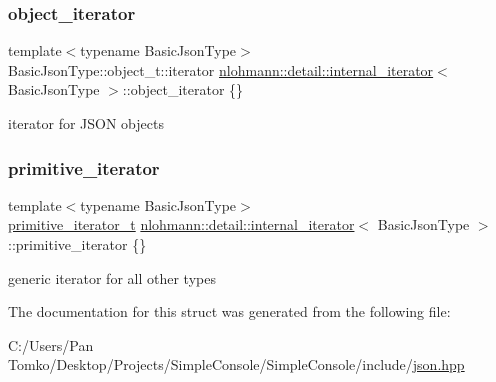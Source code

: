 \subsubsection{\texorpdfstring{object\_iterator}{object\_iterator}}
{\footnotesize\ttfamily template$<$typename Basic\+Json\+Type$>$ \\
Basic\+Json\+Type\+::object\+\_\+t\+::iterator \mbox{\hyperlink{structnlohmann_1_1detail_1_1internal__iterator}{nlohmann\+::detail\+::internal\+\_\+iterator}}$<$ Basic\+Json\+Type $>$\+::object\+\_\+iterator \{\}}



iterator for J\+S\+ON objects 

\mbox{\label{structnlohmann_1_1detail_1_1internal__iterator_a2b3bb45f968210e42c282017eeeb63a8}} 
\subsubsection{\texorpdfstring{primitive\_iterator}{primitive\_iterator}}
{\footnotesize\ttfamily template$<$typename Basic\+Json\+Type$>$ \\
\mbox{\hyperlink{classnlohmann_1_1detail_1_1primitive__iterator__t}{primitive\+\_\+iterator\+\_\+t}} \mbox{\hyperlink{structnlohmann_1_1detail_1_1internal__iterator}{nlohmann\+::detail\+::internal\+\_\+iterator}}$<$ Basic\+Json\+Type $>$\+::primitive\+\_\+iterator \{\}}



generic iterator for all other types 



The documentation for this struct was generated from the following file\+:\begin{DoxyCompactItemize}
\item 
C\+:/\+Users/\+Pan Tomko/\+Desktop/\+Projects/\+Simple\+Console/\+Simple\+Console/include/\mbox{\hyperlink{json_8hpp}{json.\+hpp}}\end{DoxyCompactItemize}
